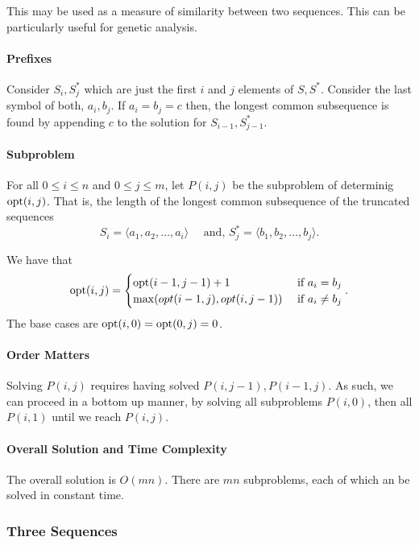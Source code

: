 This may be used as a measure of similarity between two sequences. This can be
particularly useful for genetic analysis.

\paragraph{Prefixes}
Consider \(S_i, S^*_j\) which are just the first \(i\) and  \(j\)
elements of  \(S, S^*\).
Consider the last symbol of both,  \(a_i, b_j\).
If \(a_i = b_j = c\) then, the longest common subsequence is found
by appending  \(c\) to the solution for  \(S_{i-1}, S^*_{j - 1}\).

\paragraph{Subproblem}
For all \(0 \leq i \leq n\) and  \(0 \leq j \leq m\), let \(P(i, j)\) be the
subproblem of determinig  \(\mathrm{opt}(i, j)\). That is, the length of the longest
common subsequence of the truncated sequences \[
  S_i = \langle a_1, a_2, \ldots, a_i \rangle
  \quad \text{ and, }
  S^*_j = \langle b_1, b_2, \ldots, b_j \rangle
.\]

We have that \[
  \mathrm{opt}(i, j) = \begin{cases}
    \mathrm{opt}(i - 1, j - 1) + 1 & \text{ if } a_i = b_j \\
    \max(opt(i - 1, j), opt(i, j - 1)) & \text{ if } a_i \neq b_j
  \end{cases}
.\] 
The base cases are \(\mathrm{opt}(i, 0) = \mathrm{opt}(0, j) = 0\).

\paragraph{Order Matters}
Solving \(P(i, j)\) requires having solved  \(P(i, j - 1), P(i - 1, j)\).
As such, we can proceed in a bottom up manner, by solving all
subproblems \(P(i, 0)\), then all \(P(i, 1)\) until we reach  \(P(i, j)\).

\paragraph{Overall Solution and Time Complexity}
The overall solution is \(O(mn)\).
There are  \(mn\) subproblems, each of which an be solved in constant time.

\subsubsection{Three Sequences}

